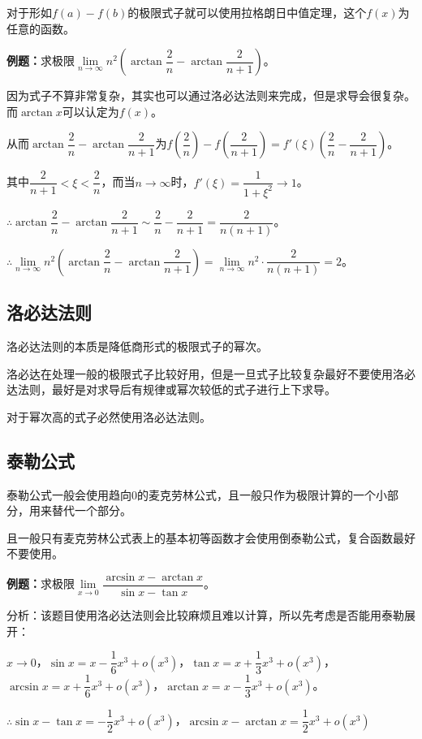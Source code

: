 \documentclass[UTF8, 12pt]{ctexart}
\begin{document}
对于形如$f(a)-f(b)$的极限式子就可以使用拉格朗日中值定理，这个$f(x)$为任意的函数。

\textbf{例题：}求极限$\lim\limits_{n\to\infty}n^2\left(\arctan\dfrac{2}{n}-\arctan\dfrac{2}{n+1}\right)$。\medskip

因为式子不算非常复杂，其实也可以通过洛必达法则来完成，但是求导会很复杂。而$\arctan x$可以认定为$f(x)$。

从而$\arctan\dfrac{2}{n}-\arctan\dfrac{2}{n+1}$为$f(\dfrac{2}{n})-f(\dfrac{2}{n+1})=f'(\xi)\left(\dfrac{2}{n}-\dfrac{2}{n+1}\right)$。

其中$\dfrac{2}{n+1}<\xi<\dfrac{2}{n}$，而当$n\to\infty$时，$f'(\xi)=\dfrac{1}{1+\xi^2}\to 1$。

$\therefore\arctan\dfrac{2}{n}-\arctan\dfrac{2}{n+1}\sim\dfrac{2}{n}-\dfrac{2}{n+1}=\dfrac{2}{n(n+1)}$。

$\therefore\lim\limits_{n\to\infty}n^2\left(\arctan\dfrac{2}{n}-\arctan\dfrac{2}{n+1}\right)=\lim\limits_{n\to\infty}n^2\cdot\dfrac{2}{n(n+1)}=2$。

\subsection{洛必达法则}

洛必达法则的本质是降低商形式的极限式子的幂次。

洛必达在处理一般的极限式子比较好用，但是一旦式子比较复杂最好不要使用洛必达法则，最好是对求导后有规律或幂次较低的式子进行上下求导。

对于幂次高的式子必然使用洛必达法则。

\subsection{泰勒公式}

泰勒公式一般会使用趋向0的麦克劳林公式，且一般只作为极限计算的一个小部分，用来替代一个部分。

且一般只有麦克劳林公式表上的基本初等函数才会使用倒泰勒公式，复合函数最好不要使用。

\textbf{例题：}求极限$\lim\limits_{x\to 0}\dfrac{\arcsin x-\arctan x}{\sin x-\tan x}$。\medskip

分析：该题目使用洛必达法则会比较麻烦且难以计算，所以先考虑是否能用泰勒展开：

$x\to 0$，$\sin x=x-\dfrac{1}{6}x^3+o(x^3)$，$\tan x=x+\dfrac{1}{3}x^3+o(x^3)$，$\arcsin x=x+\dfrac{1}{6}x^3+o(x^3)$，$\arctan x=x-\dfrac{1}{3}x^3+o(x^3)$。

$\therefore \sin x-\tan x=-\dfrac{1}{2}x^3+o(x^3)$，$\arcsin x-\arctan x=\dfrac{1}{2}x^3+o(x^3)$
\end{document}
